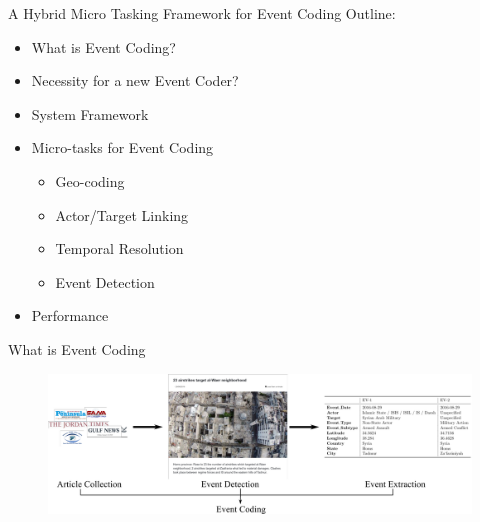 \begin{frame}{A Hybrid Micro Tasking Framework for Event Coding}
Outline:
\begin{itemize}
    \item What is Event Coding?
    \item Necessity for a new Event Coder?
    \item System Framework
    \item Micro-tasks for Event Coding
\begin{itemize}
   \item Geo-coding
    \item Actor/Target Linking
    \item Temporal Resolution
    \item Event Detection
\end{itemize} 
    \item Performance
\end{itemize}
\end{frame}


\begin{frame}{What is Event Coding}
    \begin{figure}
        \centering
        \includegraphics[width=\textwidth]{Problem2/figures/EventCoding_intro.pdf}
        \label{fig:my_label}
    \end{figure}
\end{frame}


